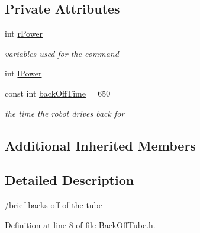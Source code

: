 \subsection*{Private Attributes}
\begin{DoxyCompactItemize}
\item 
int \hyperlink{classBackOffTube_aa03d7c0535e3d7dd4c45a0453ea9f3aa}{r\-Power}
\begin{DoxyCompactList}\small\item\em variables used for the command \end{DoxyCompactList}\item 
int \hyperlink{classBackOffTube_a5eee02bb4a6756ea44206e411211aea8}{l\-Power}
\item 
const int \hyperlink{classBackOffTube_a46fdecac50000c6b1e9ecae3e42ea4b4}{back\-Off\-Time} = 650
\begin{DoxyCompactList}\small\item\em the time the robot drives back for \end{DoxyCompactList}\end{DoxyCompactItemize}
\subsection*{Additional Inherited Members}


\subsection{Detailed Description}
/brief backs off of the tube 

Definition at line 8 of file Back\-Off\-Tube.\-h.



